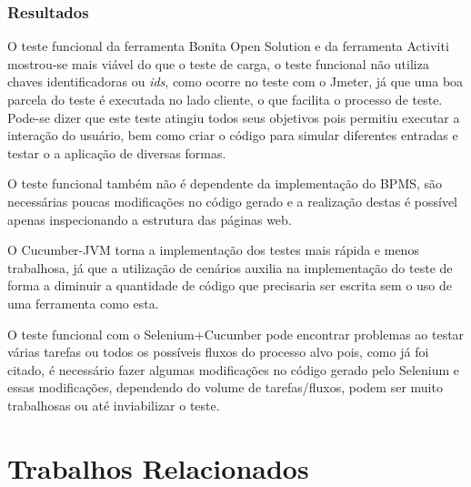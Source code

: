\documentclass[12pt]{article}
\begin{document}
\subsubsection{Resultados}

O teste funcional da ferramenta Bonita Open Solution e da ferramenta Activiti mostrou-se mais viável do que o teste de carga, o teste funcional não utiliza chaves identificadoras ou \emph{ids}, como ocorre no teste com o Jmeter, já que uma boa parcela do teste é executada no lado cliente, o que facilita o processo de teste. Pode-se dizer que este teste atingiu todos seus objetivos pois permitiu executar a interação do usuário, bem como criar o código para simular diferentes entradas e testar o a aplicação de diversas formas.

O teste funcional também não é dependente da implementação do BPMS, são necessárias poucas modificações no código gerado e a realização destas é possível apenas inspecionando a estrutura das páginas web.

O Cucumber-JVM torna a implementação dos testes mais rápida e menos trabalhosa, já que a utilização de cenários auxilia na implementação do teste de forma a diminuir a quantidade de código que precisaria ser escrita sem o uso de uma ferramenta como esta.

O teste funcional com o Selenium+Cucumber pode encontrar problemas ao testar várias tarefas ou todos os possíveis fluxos do processo alvo pois, como já foi citado, é necessário fazer algumas modificações no código gerado pelo Selenium e essas modificações, dependendo do volume de tarefas/fluxos, podem ser muito trabalhosas ou até inviabilizar o teste.

\section{Trabalhos Relacionados}


\end{document}
